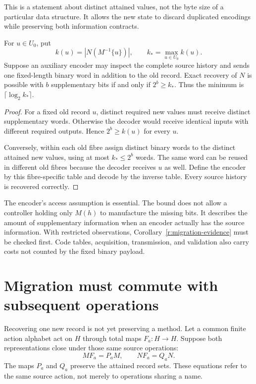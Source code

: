 This is a statement about distinct attained values, not the byte size of a particular data structure. It allows the new state to discard duplicated encodings while preserving both information contracts.

\begin{theorem}\label{r:migration-bits}
For $u\in U_0$, put
\[
 k(u)=|N(M^{-1}\{u\})|,\qquad k_* =\max_{u\in U_0}k(u).
\]
Suppose an auxiliary encoder may inspect the complete source history and sends one fixed-length binary word in addition to the old record. Exact recovery of $N$ is possible with $b$ supplementary bits if and only if $2^b\ge k_*$. Thus the minimum is $\lceil\log_2 k_*\rceil$.
\end{theorem}
\begin{proof}
For a fixed old record $u$, distinct required new values must receive distinct supplementary words. Otherwise the decoder would receive identical inputs with different required outputs. Hence $2^b\ge k(u)$ for every $u$.

Conversely, within each old fibre assign distinct binary words to the distinct attained new values, using at most $k_*\le 2^b$ words. The same word can be reused in different old fibres because the decoder receives $u$ as well. Define the encoder by this fibre-specific table and decode by the inverse table. Every source history is recovered correctly.
\end{proof}

The encoder's access assumption is essential. The bound does not allow a controller holding only $M(h)$ to manufacture the missing bits. It describes the amount of supplementary information when an encoder actually has the source information. With restricted observations, Corollary~\ref{r:migration-evidence} must be checked first. Code tables, acquisition, transmission, and validation also carry costs not counted by the fixed binary payload.

\section{Migration must commute with subsequent operations}
Recovering one new record is not yet preserving a method. Let a common finite action alphabet act on $H$ through total maps $F_a:H\to H$. Suppose both representations close under those same source operations:
\[
 M F_a=P_a M,\qquad N F_a=Q_a N.
\]
The maps $P_a$ and $Q_a$ preserve the attained record sets. These equations refer to the same source action, not merely to operations sharing a name.

